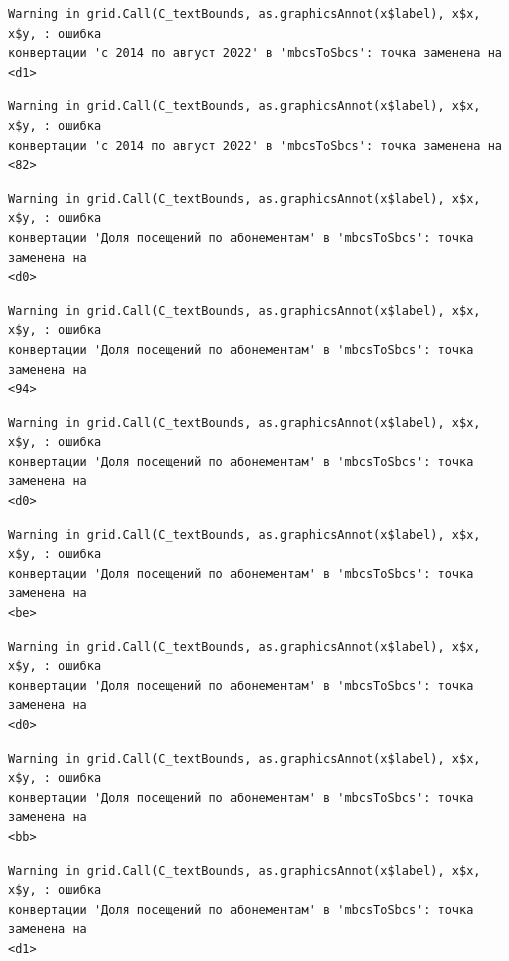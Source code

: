 \documentclass[
  letterpaper,
  DIV=11,
  numbers=noendperiod]{scrreprt}
\begin{document}
\begin{verbatim}
Warning in grid.Call(C_textBounds, as.graphicsAnnot(x$label), x$x, x$y, : ошибка
конвертации 'с 2014 по август 2022' в 'mbcsToSbcs': точка заменена на <d1>
\end{verbatim}

\begin{verbatim}
Warning in grid.Call(C_textBounds, as.graphicsAnnot(x$label), x$x, x$y, : ошибка
конвертации 'с 2014 по август 2022' в 'mbcsToSbcs': точка заменена на <82>
\end{verbatim}

\begin{verbatim}
Warning in grid.Call(C_textBounds, as.graphicsAnnot(x$label), x$x, x$y, : ошибка
конвертации 'Доля посещений по абонементам' в 'mbcsToSbcs': точка заменена на
<d0>
\end{verbatim}

\begin{verbatim}
Warning in grid.Call(C_textBounds, as.graphicsAnnot(x$label), x$x, x$y, : ошибка
конвертации 'Доля посещений по абонементам' в 'mbcsToSbcs': точка заменена на
<94>
\end{verbatim}

\begin{verbatim}
Warning in grid.Call(C_textBounds, as.graphicsAnnot(x$label), x$x, x$y, : ошибка
конвертации 'Доля посещений по абонементам' в 'mbcsToSbcs': точка заменена на
<d0>
\end{verbatim}

\begin{verbatim}
Warning in grid.Call(C_textBounds, as.graphicsAnnot(x$label), x$x, x$y, : ошибка
конвертации 'Доля посещений по абонементам' в 'mbcsToSbcs': точка заменена на
<be>
\end{verbatim}

\begin{verbatim}
Warning in grid.Call(C_textBounds, as.graphicsAnnot(x$label), x$x, x$y, : ошибка
конвертации 'Доля посещений по абонементам' в 'mbcsToSbcs': точка заменена на
<d0>
\end{verbatim}

\begin{verbatim}
Warning in grid.Call(C_textBounds, as.graphicsAnnot(x$label), x$x, x$y, : ошибка
конвертации 'Доля посещений по абонементам' в 'mbcsToSbcs': точка заменена на
<bb>
\end{verbatim}

\begin{verbatim}
Warning in grid.Call(C_textBounds, as.graphicsAnnot(x$label), x$x, x$y, : ошибка
конвертации 'Доля посещений по абонементам' в 'mbcsToSbcs': точка заменена на
<d1>
\end{verbatim}
\end{document}
